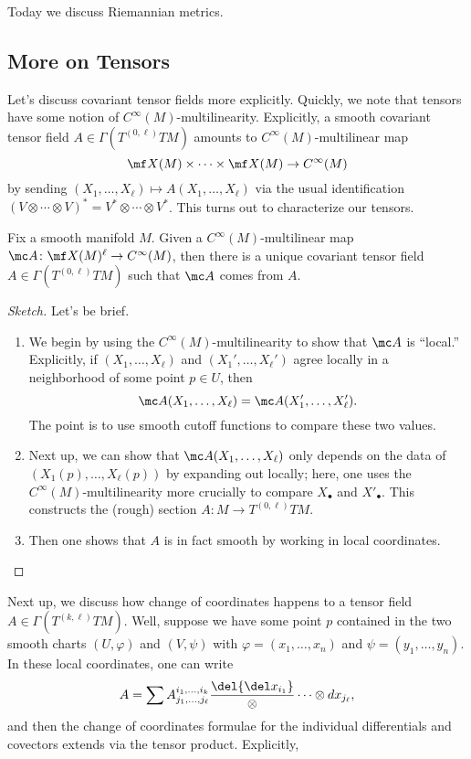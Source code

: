 \documentclass[../notes.tex]{subfiles}
\begin{document}
Today we discuss Riemannian metrics.

\subsection{More on Tensors}
Let's discuss covariant tensor fields more explicitly. Quickly, we note that tensors have some notion of $C^\infty(M)$-multilinearity. Explicitly, a smooth covariant tensor field $A\in\Gamma\left(T^{(0,\ell)}TM\right)$ amounts to $C^\infty(M)$-multilinear map
\[\mf X(M)\times\cdots\times\mf X(M)\to C^\infty(M)\]
by sending $(X_1,\ldots,X_\ell)\mapsto A(X_1,\ldots,X_\ell)$ via the usual identification $(V\otimes\cdots\otimes V)^*=V^*\otimes\cdots\otimes V^*$. This turns out to characterize our tensors.
\begin{proposition}
	Fix a smooth manifold $M$. Given a $C^\infty(M)$-multilinear map $\mc A\colon\mf X(M)^\ell\to C^\infty(M)$, then there is a unique covariant tensor field $A\in\Gamma\left(T^{(0,\ell)}TM\right)$ such that $\mc A$ comes from $A$.
\end{proposition}
\begin{proof}[Sketch]
	Let's be brief.
	\begin{enumerate}
		\item We begin by using the $C^\infty(M)$-multilinearity to show that $\mc A$ is ``local.'' Explicitly, if $(X_1,\ldots,X_\ell)$ and $(X_1',\ldots,X_\ell')$ agree locally in a neighborhood of some point $p\in U$, then
		\[\mc A(X_1,\ldots,X_\ell)=\mc A(X_1',\ldots,X_\ell').\]
		The point is to use smooth cutoff functions to compare these two values.
		\item Next up, we can show that $\mc A(X_1,\ldots,X_\ell)$ only depends on the data of $(X_1(p),\ldots,X_\ell(p))$ by expanding out locally; here, one uses the $C^\infty(M)$-multilinearity more crucially to compare $X_\bullet$ and $X'_\bullet$. This constructs the (rough) section $A\colon M\to T^{(0,\ell)}TM$.
		\item Then one shows that $A$ is in fact smooth by working in local coordinates.
		\qedhere
	\end{enumerate}
\end{proof}
Next up, we discuss how change of coordinates happens to a tensor field $A\in\Gamma\left(T^{(k,\ell)}TM\right)$. Well, suppose we have some point $p$ contained in the two smooth charts $(U,\varphi)$ and $(V,\psi)$ with $\varphi=(x_1,\ldots,x_n)$ and $\psi=(y_1,\ldots,y_n)$. In these local coordinates, one can write
\[A=\sum A^{i_1,\ldots,i_k}_{j_1,\ldots,j_\ell}\frac\del{\del x_{i_1}}\otimes\cdots\otimes dx_{j_\ell},\]
and then the change of coordinates formulae for the individual differentials and covectors extends via the tensor product. Explicitly, 
\end{document}
